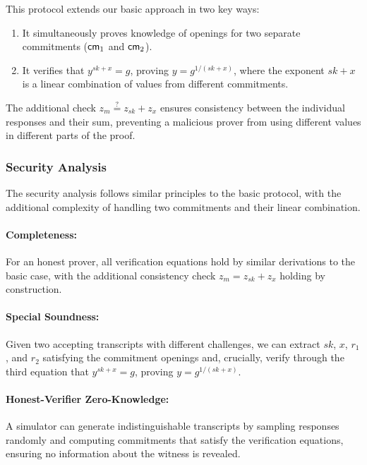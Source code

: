 This protocol extends our basic approach in two key ways:
\begin{enumerate}
    \item It simultaneously proves knowledge of openings for two separate commitments ($\mathsf{cm}_1$ and $\mathsf{cm}_2$).
    \item It verifies that $y^{sk+x} = g$, proving $y = g^{1/(sk+x)}$, where the exponent $sk+x$ is a linear combination of values from different commitments.
\end{enumerate}

The additional check $z_m \stackrel{?}{=} z_{sk} + z_x$ ensures consistency between the individual responses and their sum, preventing a malicious prover from using different values in different parts of the proof.

\subsubsection{Security Analysis}

The security analysis follows similar principles to the basic protocol, with the additional complexity of handling two commitments and their linear combination.

\paragraph{Completeness:} For an honest prover, all verification equations hold by similar derivations to the basic case, with the additional consistency check $z_m = z_{sk} + z_x$ holding by construction.

\paragraph{Special Soundness:} Given two accepting transcripts with different challenges, we can extract $sk$, $x$, $r_1$, and $r_2$ satisfying the commitment openings and, crucially, verify through the third equation that $y^{sk+x} = g$, proving $y = g^{1/(sk+x)}$.

\paragraph{Honest-Verifier Zero-Knowledge:} A simulator can generate indistinguishable transcripts by sampling responses randomly and computing commitments that satisfy the verification equations, ensuring no information about the witness is revealed.

